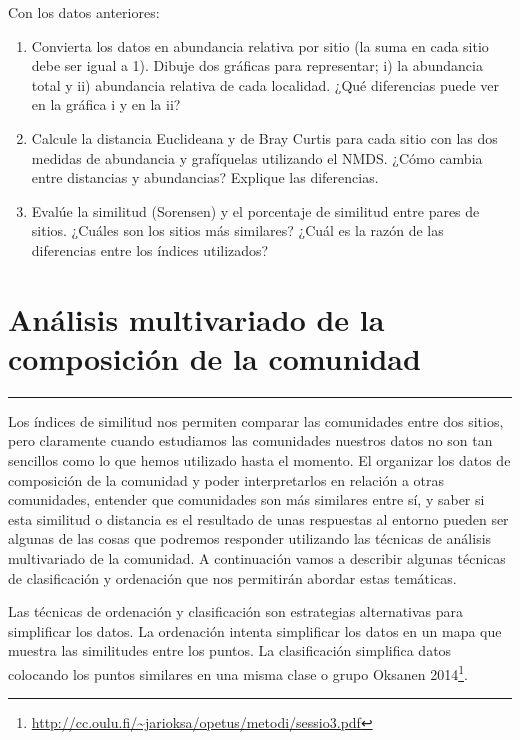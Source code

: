 \documentclass[]{book}
\let\rmarkdownfootnote\footnote%
\def\footnote{\protect\rmarkdownfootnote}
\begin{document}
Con los datos anteriores:

\begin{enumerate}
\def\labelenumi{\alph{enumi}.}
\item
  Convierta los datos en abundancia relativa por sitio (la suma en cada
  sitio debe ser igual a 1). Dibuje dos gráficas para representar; i) la
  abundancia total y ii) abundancia relativa de cada localidad. ¿Qué
  diferencias puede ver en la gráfica i y en la ii?
\item
  Calcule la distancia Euclideana y de Bray Curtis para cada sitio con
  las dos medidas de abundancia y grafíquelas utilizando el NMDS. ¿Cómo
  cambia entre distancias y abundancias? Explique las diferencias.
\item
  Evalúe la similitud (Sorensen) y el porcentaje de similitud entre
  pares de sitios. ¿Cuáles son los sitios más similares? ¿Cuál es la
  razón de las diferencias entre los índices utilizados?
\end{enumerate}

\chapter{Análisis multivariado de la composición de la
comunidad}\label{analisis-multivariado-de-la-composicion-de-la-comunidad}

\begin{center}\rule{0.5\linewidth}{\linethickness}\end{center}

Los índices de similitud nos permiten comparar las comunidades entre dos
sitios, pero claramente cuando estudiamos las comunidades nuestros datos
no son tan sencillos como lo que hemos utilizado hasta el momento. El
organizar los datos de composición de la comunidad y poder
interpretarlos en relación a otras comunidades, entender que comunidades
son más similares entre sí, y saber si esta similitud o distancia es el
resultado de unas respuestas al entorno pueden ser algunas de las cosas
que podremos responder utilizando las técnicas de análisis multivariado
de la comunidad. A continuación vamos a describir algunas técnicas de
clasificación y ordenación que nos permitirán abordar estas temáticas.

Las técnicas de ordenación y clasificación son estrategias alternativas
para simplificar los datos. La ordenación intenta simplificar los datos
en un mapa que muestra las similitudes entre los puntos. La
clasificación simplifica datos colocando los puntos similares en una
misma clase o grupo Oksanen 2014\footnote{\url{http://cc.oulu.fi/~jarioksa/opetus/metodi/sessio3.pdf}}.
\end{document}
